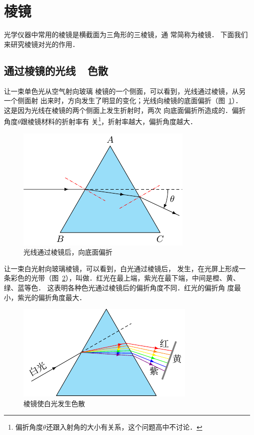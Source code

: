 \section{棱镜}

光学仪器中常用的棱镜是横截面为三角形的三棱镜，通
常简称为棱镜．
下面我们来研究棱镜对光的作用．

\subsection{通过棱镜的光线~~色散}

让一束单色光从空气射向玻璃
棱镜的一个侧面，可以看到，光线通过棱镜，从另一个侧面射
出来时，方向发生了明显的变化；光线向棱镜的底面偏折（图~\ref{fig_C_5-31}）．
这是因为光线在棱镜的两个侧面上发生折射时，两次
向底面偏折所造成的．偏折角度$\theta$跟棱镜材料的折射率有
关\footnote{偏折角度$\theta$还跟入射角的大小有关系，这个问题高中不讨论．}，折射率越大，偏折角度越大．
\begin{figure}[htbp]
    \centering
    \includegraphics{fig/C/5-31.pdf}
    \caption{光线通过棱镜后，向底面偏折}\label{fig_C_5-31}
\end{figure}

让一束白光射向玻璃棱镜，可以看到，白光通过棱镜后，
发生，在光屏上形成一条彩色的光带（图~\ref{fig_C_5-32}），叫做．红光在最上端，紫光在最下端，中间是橙、黄、绿、蓝等色．
这表明各种色光通过棱镜后的偏折角度不同．红光的偏折角
度最小，紫光的偏折角度最大．
\begin{figure}[htbp]
    \centering
    \includegraphics{fig/C/5-32.pdf}
    \caption{棱镜使白光发生色散}\label{fig_C_5-32}
\end{figure}

